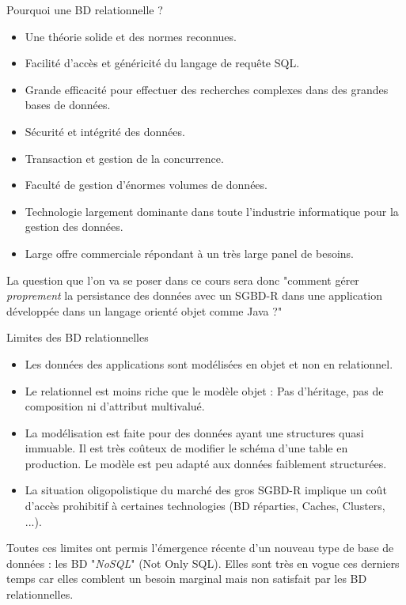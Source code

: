 \documentclass[xcolor=pdftex,x11names,table]{beamer}
\begin{document}
    \begin{frame}{Pourquoi une BD relationnelle ?}
      \begin{itemize}
        \item Une théorie solide et des normes reconnues.
        \item Facilité d'accès et généricité du langage de requête SQL.
        \item Grande efficacité pour effectuer des recherches complexes 
        dans des grandes bases de données.
        \item Sécurité et intégrité des données.
        \item Transaction et gestion de la concurrence.
        \item Faculté de gestion d'énormes volumes de données. 
        \item Technologie largement dominante dans toute l'industrie informatique pour la gestion des données.
        \item Large offre commerciale répondant à un très large panel de besoins.
      \end{itemize}
      \pause
      La question que l'on va se poser dans ce cours sera donc "comment gérer \emph{proprement} la persistance des données 
      avec un SGBD-R dans une application développée dans un langage orienté objet comme Java ?"
    \end{frame}
    
    \begin{frame}{Limites des BD relationnelles}
      \begin{itemize}
        \item Les données des applications sont modélisées en objet et non en relationnel.
        \item Le relationnel est moins riche que le modèle objet : Pas d'héritage, 
        pas de composition ni d'attribut multivalué.
        \item La modélisation est faite pour des données ayant une structures quasi immuable. Il est très coûteux de 
        modifier le schéma d'une table en production. Le modèle est peu adapté aux données faiblement structurées.
        \item La situation oligopolistique du marché des gros SGBD-R implique un coût d'accès prohibitif à certaines technologies 
        (BD réparties, Caches, Clusters, ...).
      \end{itemize}
      Toutes ces limites ont permis l'émergence récente d'un nouveau type de base de données : les BD "\emph{NoSQL}" 
      (Not Only SQL). Elles sont très en vogue ces derniers temps car elles comblent un besoin marginal mais non 
      satisfait par les BD relationnelles.
    \end{frame}
    
\end{document}
